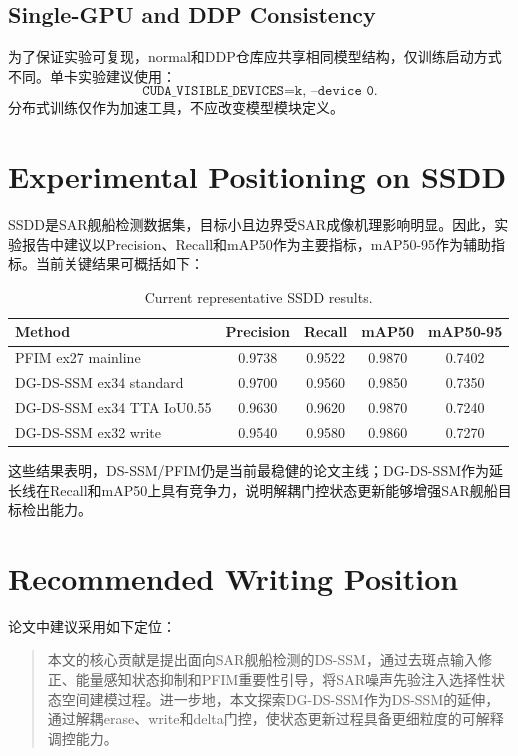 \documentclass[UTF8,zihao=-4]{ctexart}
\begin{document}
\subsection{Single-GPU and DDP Consistency}

为了保证实验可复现，normal和DDP仓库应共享相同模型结构，仅训练启动方式不同。单卡实验建议使用：
\begin{equation}
  \texttt{CUDA\_VISIBLE\_DEVICES=k, --device 0}.
\end{equation}
分布式训练仅作为加速工具，不应改变模型模块定义。

\section{Experimental Positioning on SSDD}

SSDD是SAR舰船检测数据集，目标小且边界受SAR成像机理影响明显。因此，实验报告中建议以Precision、Recall和mAP50作为主要指标，mAP50-95作为辅助指标。当前关键结果可概括如下：

\begin{table}[h]
\centering
\caption{Current representative SSDD results.}
\begin{tabular}{lcccc}
\toprule
Method & Precision & Recall & mAP50 & mAP50-95 \\
\midrule
PFIM ex27 mainline & 0.9738 & 0.9522 & 0.9870 & 0.7402 \\
DG-DS-SSM ex34 standard & 0.9700 & 0.9560 & 0.9850 & 0.7350 \\
DG-DS-SSM ex34 TTA IoU0.55 & 0.9630 & 0.9620 & 0.9870 & 0.7240 \\
DG-DS-SSM ex32 write & 0.9540 & 0.9580 & 0.9860 & 0.7270 \\
\bottomrule
\end{tabular}
\end{table}

这些结果表明，DS-SSM/PFIM仍是当前最稳健的论文主线；DG-DS-SSM作为延长线在Recall和mAP50上具有竞争力，说明解耦门控状态更新能够增强SAR舰船目标检出能力。

\section{Recommended Writing Position}

论文中建议采用如下定位：

\begin{quote}
本文的核心贡献是提出面向SAR舰船检测的DS-SSM，通过去斑点输入修正、能量感知状态抑制和PFIM重要性引导，将SAR噪声先验注入选择性状态空间建模过程。进一步地，本文探索DG-DS-SSM作为DS-SSM的延伸，通过解耦erase、write和delta门控，使状态更新过程具备更细粒度的可解释调控能力。
\end{quote}
\end{document}
